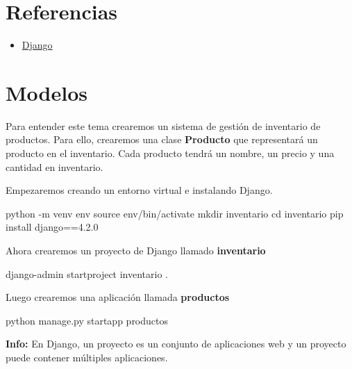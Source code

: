 \documentclass[
  a4paper,
  DIV=11,
  numbers=noendperiod,
  onepage,
  openany]{scrreprt}
\newenvironment{Shaded}{\begin{snugshade}}{\end{snugshade}}
\newcommand{\AttributeTok}[1]{\textcolor[rgb]{0.40,0.45,0.13}{#1}}
\newcommand{\BuiltInTok}[1]{\textcolor[rgb]{0.00,0.23,0.31}{#1}}
\newcommand{\ExtensionTok}[1]{\textcolor[rgb]{0.00,0.23,0.31}{#1}}
\newcommand{\FunctionTok}[1]{\textcolor[rgb]{0.28,0.35,0.67}{#1}}
\newcommand{\NormalTok}[1]{\textcolor[rgb]{0.00,0.23,0.31}{#1}}
\providecommand{\tightlist}{%
  \setlength{\itemsep}{0pt}\setlength{\parskip}{0pt}}\usepackage{longtable,booktabs,array}
\begin{document}
\chapter{Referencias}\label{referencias}

\begin{itemize}
\tightlist
\item
  \href{https://www.djangoproject}{Django}
\end{itemize}

\chapter{Modelos}\label{modelos}

Para entender este tema crearemos un sistema de gestión de inventario de
productos. Para ello, crearemos una clase \textbf{Producto} que
representará un producto en el inventario. Cada producto tendrá un
nombre, un precio y una cantidad en inventario.

Empezaremos creando un entorno virtual e instalando Django.

\begin{Shaded}
\begin{Highlighting}[]
\ExtensionTok{python} \AttributeTok{{-}m}\NormalTok{ venv env}
\BuiltInTok{source}\NormalTok{ env/bin/activate}
\FunctionTok{mkdir}\NormalTok{ inventario}
\BuiltInTok{cd}\NormalTok{ inventario}
\ExtensionTok{pip}\NormalTok{ install django==4.2.0}
\end{Highlighting}
\end{Shaded}

Ahora crearemos un proyecto de Django llamado \textbf{inventario}

\begin{Shaded}
\begin{Highlighting}[]
\ExtensionTok{django{-}admin}\NormalTok{ startproject inventario .}
\end{Highlighting}
\end{Shaded}

Luego crearemos una aplicación llamada \textbf{productos}

\begin{Shaded}
\begin{Highlighting}[]
\ExtensionTok{python}\NormalTok{ manage.py startapp productos}
\end{Highlighting}
\end{Shaded}

\textbf{Info:} En Django, un proyecto es un conjunto de aplicaciones web
y un proyecto puede contener múltiples aplicaciones.
\end{document}
